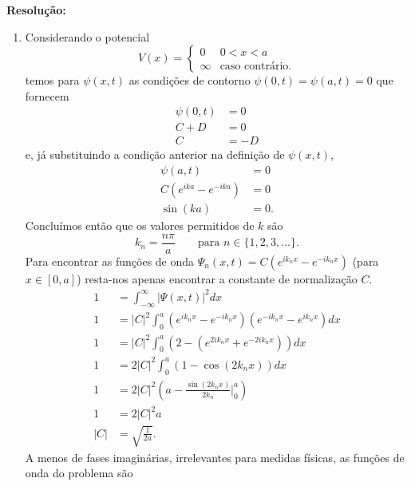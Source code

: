 \documentclass[a4paper, 12pt, notitlepage]{article}
\begin{document}
\begin{enumerate}
\textbf{Resolução: }\linebreak
\begin{enumerate}
  \item Considerando o potencial
  \begin{equation*}
  V(x) = \begin{cases} 0 &0 < x < a \\ 
  \infty &\text{caso contrário.}
  \end{cases}
  \end{equation*}
  \noindent temos para $\psi(x, t)$ as condições de contorno $\psi(0, t) = \psi(a, t) = 0$ que fornecem
  \begin{align*}
  \psi(0, t) &= 0 \\
  C + D &= 0\\
  C &= -D
  \end{align*}
  \noindent e, já substituindo a condição anterior na definição de $\psi(x,t)$,
  \begin{align*}
  \psi(a, t) &= 0\\
  C\left(e^{ika} - e^{-ika}\right) &= 0 \\
  \sin(ka) &= 0.
  \end{align*}
  Concluímos então que os valores permitidos de $k$ são
  \begin{equation*}
  k_n = \frac{n\pi}{a}\qquad\text{para }n \in \{1, 2, 3,\ldots\}.
  \end{equation*}
  Para encontrar as funções de onda $\Psi_n(x, t) = C\left(e^{ik_nx} - e^{-ik_n x}\right)$ (para $x \in [0, a]$) resta-nos apenas encontrar a constante de normalização $C$.
  \begin{align*}
  1 &= \int_{-\infty}^{\infty} \left| \Psi(x,t)\right|^2 dx \\
  1 &= \left| C\right|^2 \int_0^a \left(e^{ik_nx} - e^{-ik_nx}\right)\left(e^{-ik_nx} - e^{ik_nx}\right) dx \\
  1 &= \left| C\right|^2 \int_0^a \left(2 - \left(e^{2ik_nx} + e^{-2ik_nx}\right)\right) dx \\
  1 &= 2\left| C\right|^2 \int_0^a \left(1 - \cos(2k_n x)\right) dx \\
  1 &= 2\left| C\right|^2 \left(a - \frac{\sin(2k_nx)}{2k_n}\Big|_0^a\right) \\
  1 &= 2\left| C\right|^2 a \\
  \left| C \right| &= \sqrt{\frac{1}{2a}}.
  \end{align*}
  A menos de fases imaginárias, irrelevantes para medidas físicas, as funções de onda do problema são
  \begin{equation*}

\end{equation*}
\end{enumerate}
\end{enumerate}
\end{document}

